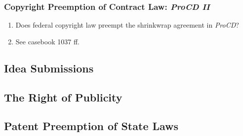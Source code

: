 \subsubsection{Copyright Preemption of Contract Law: \emph{ProCD II}}

\begin{enumerate}
    \item Does federal copyright law preempt the shrinkwrap agreement in 
    \emph{ProCD}?
    \item See casebook 1037 ff.
\end{enumerate}

\newpage %

\subsection{Idea Submissions}


\subsection{The Right of Publicity}


\subsection{Patent Preemption of State Laws}

